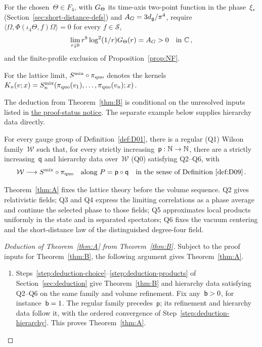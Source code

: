 \begin{definition}\label{def:Q6}
For the chosen~$\Theta\in F_4$, with $G_{\Theta}$ its time-axis two-point function in the phase~$\xi_*$ (Section~\ref{sec:short-distance-defs}) and $A_G=3d_{\mathfrak{g}}/\pi^4$, require $\langle\Omega,\Phi(\iota_4\Theta,f)\Omega\rangle=0$ for every $f\in\mathcal S$,
\begin{equation*}
\lim_{r\downarrow0}r^8\log^2(1/r)G_{\Theta}(r)=A_G>0
\quad\text{in }\mathbb{C}\,,
\end{equation*}
and the finite-profile exclusion of Proposition~\ref{prop:NF}.
\end{definition}

For the lattice limit, $S^{\rm mix}\circ\pi_{\rm quo}$ denotes the kernels $K_n(v;x)=S_n^{\rm mix}(\pi_{\rm quo}(v_1),\ldots,\pi_{\rm quo}(v_n);x)$.

The deduction from Theorem~\ref{thm:B} is conditional on the unresolved inputs listed in \hyperref[par:proof-status]{the proof-status notice}. The separate example below supplies hierarchy data directly.

\setcounter{maintheorem}{0}
\begin{maintheorem}[Existence]\label{thm:A}
For every gauge group of Definition~\ref{def:D01}, there is a regular \textup{(Q1)} Wilson family~$\mathcal W$ such that, for every strictly increasing~$\mathsf p:\mathbb{N}\to\mathbb{N}$, there are a strictly increasing~$\mathsf q$ and hierarchy data over~$\mathcal W$ \textup{(Q0)} satisfying \textup{Q2--Q6}, with
\begin{equation*}
\mathcal W\longrightarrow S^{\rm mix}\circ\pi_{\rm quo}
\quad\text{along }P=\mathsf p\circ\mathsf q
\quad\text{in the sense of Definition~\ref{def:D09}}\,.
\end{equation*}
\end{maintheorem}

Theorem~\ref{thm:A} fixes the lattice theory before the volume sequence. Q2 gives relativistic fields; Q3 and Q4 express the limiting correlations as a phase average and continue the selected phase to those fields; Q5 approximates local products uniformly in the state and in separated spectators; Q6 fixes the vacuum centering and the short-distance law of the distinguished degree-four field.

\begin{proof}[Deduction of Theorem~\ref{thm:A} from Theorem~\ref{thm:B}]
Subject to the proof inputs for Theorem~\ref{thm:B}, the following argument gives Theorem~\ref{thm:A}.
\begin{enumerate}[label=\textup{\arabic*.},ref=\arabic*,start=10]
\item\label{step:deduction-conclusion} Steps~\ref{step:deduction-choice}--\ref{step:deduction-products} of Section~\ref{sec:deduction} give Theorem~\ref{thm:B} and hierarchy data satisfying Q2--Q6 on the same family and volume refinement. Fix any~$\mathsf{b}>0$, for instance~$\mathsf{b}=1$. The regular family precedes~$\mathsf p$; its refinement and hierarchy data follow it, with the ordered convergence of Step~\ref{step:deduction-hierarchy}. This proves Theorem~\ref{thm:A}.\qedhere
\end{enumerate}
\end{proof}

